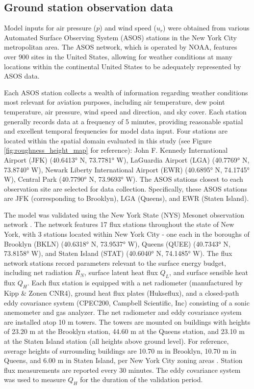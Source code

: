 \subsection{Ground station observation data}  \label{methodology-ground-station}
Model inputs for air pressure ($p$) and wind speed ($u_r$) were obtained from various Automated Surface Observing System (ASOS) stations in the New York City metropolitan area. The ASOS network, which is operated by NOAA, features over 900 sites in the United States, allowing for weather conditions at many locations within the continental United States to be adequately represented by ASOS data.

Each ASOS station collects a wealth of information regarding weather conditions most relevant for aviation purposes, including air temperature, dew point temperature, air pressure, wind speed and direction, and sky cover. Each station generally records data at a frequency of 5 minutes, providing reasonable spatial and excellent temporal frequencies for model data input. Four stations are located within the spatial domain evaluated in this study (see Figure \ref{fig:roughness_height_map} for reference): John F. Kennedy International Airport (JFK) (40.6413° N, 73.7781° W), LaGuardia Airport (LGA) (40.7769° N, 73.8740° W), Newark Liberty International Airport (EWR) (40.6895° N, 74.1745° W), Central Park (40.7790° N,  73.9693° W). The ASOS stations closest to each observation site are selected for data collection. Specifically, these ASOS stations are JFK (corresponding to Brooklyn), LGA (Queens), and EWR (Staten Island).

The model was validated using the New York State (NYS) Mesonet observation network \citep{NYS_Mesonet}. The network features 17 flux stations throughout the state of New York, with 3 stations located within New York City - one each in the boroughs of Brooklyn (BKLN) (40.6318° N, 73.9537° W), Queens (QUEE) (40.7343° N, 73.8158° W), and Staten Island (STAT) (40.6040° N, 74.1485° W). The flux network stations record parameters relevant to the surface energy budget, including net radiation $R_N$,  surface latent heat flux $Q_L$, and surface sensible heat flux $Q_H$.  Each flux station is equipped with a net radiometer (manufactured by Kipp \& Zonen CNR4), ground heat flux plates (Hukseflux), and a closed-path eddy covariance system (CPEC200, Campbell Scientific, Inc) consisting of a sonic anemometer and gas analyzer. The net radiometer and eddy covariance system are installed atop 10 m towers. The towers are mounted on buildings with heights of 23.20 m at the Brooklyn station, 44.60 m at the Queens station, and 23.10 m at the Staten Island station (all heights above ground level). For reference, average heights of surrounding buildings are 10.70 m in Brooklyn, 10.70 m in Queens, and 6.00 m in Staten Island, per New York City zoning areas \citep{NYCDOCP}. Station flux measurements are reported every 30 minutes. The eddy covariance system was used to measure $Q_H$ for the duration of the validation period. 

